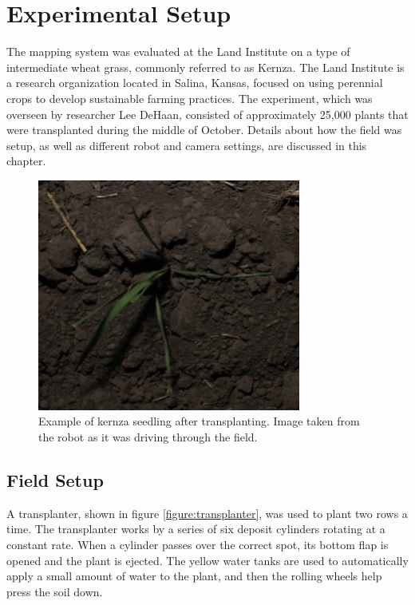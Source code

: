 
\cleardoublepage

\chapter{Experimental Setup}
\label{chapter:experiment}

The mapping system was evaluated at the Land Institute on a type of intermediate wheat grass, commonly referred to as Kernza.  The Land Institute is a research organization located in Salina, Kansas, focused on using perennial crops to develop sustainable farming practices.  The experiment, which was overseen by researcher Lee DeHaan, consisted of approximately 25,000 plants that were transplanted during the middle of October.  Details about how the field was setup, as well as different robot and camera settings, are discussed in this chapter. 

\begin{figure}[htb]
	\centering
    \includegraphics[height=3in]{figures/kernza_example.jpg}
    \caption[Kernza plant image]{Example of kernza seedling after transplanting. Image taken from the robot as it was driving through the field.}
    \label{figure:kernza_example}
\end{figure}

\section{Field Setup}
\label{section:field_setup}

A transplanter, shown in figure \ref{figure:transplanter}, was used to plant two rows a time.  The transplanter works by a series of six deposit cylinders rotating at a constant rate.  When a cylinder passes over the correct spot, its bottom flap is opened and the plant is ejected.  The yellow water tanks are used to automatically apply a small amount of water to the plant, and then the rolling wheels help press the soil down.  

